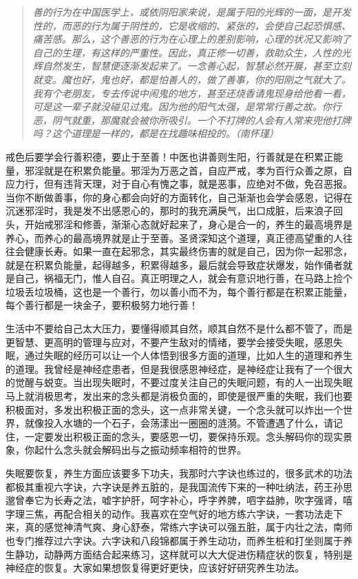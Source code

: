 \begin{quote}\it
    善的行为在中国医学上，或依阴阳家来说，是属于阳的光辉的一面，是开发性的，而恶的行为属于阴性的，它是收缩的、紧张的，会使自己起恐惧感、痛苦感。那么，这个善恶的行为在心理上的差别影响，心理的状况又影响了自己的生理，有这样的严重性。因此，真正修一切善，救助众生，人性的光辉自然发生，智慧便逐渐发起来了。一念善心起，智慧必然开展，甚至立刻就变。魔也好，鬼也好，都是怕善人的，做了善事，你的阳刚之气就大了。我有个老朋友，专去传说中闹鬼的地方，甚至还烧香请鬼现身给他看一看，可是这一辈子就没碰见过鬼。因为他的阳气太强，是常常行善之故。你行恶，阴气就重，那魔就会被你所吸引。一个不打牌的人会有人常来兜他打牌吗？这个道理是一样的，都是在找趣味相投的。（南怀瑾）
\end{quote}

戒色后要学会行善积德，要止于至善！中医也讲善则生阳，行善就是在积累正能量，邪淫就是在积累负能量。邪淫为万恶之首，自应严戒，孝为百行众善之原，自应力行，但有违背天理，对于自心有愧之事，就是恶事，应绝对不做，免召恶报。当你不断做善事，你的身心都会向好的方面转化，自己渐渐也会学会感恩，记得在沉迷邪淫时，我是发不出感恩心的，那时的我充满戾气，出口成脏，后来浪子回头，开始戒邪淫和修善，渐渐心态就好起来了，身心是合一的，养生的最高境界是养心，而养心的最高境界就是止于至善。圣贤深知这个道理，真正德高望重的人往往会健康长寿。如果一直在起邪念，其实最终伤害的就是自己，因为你一起邪念，就是在积累负能量，起得越多，积累得越多，最后就会导致症状爆发，始作俑者就是自己，祸福无门，惟人自召。真正明理之人，就会有意识地行善，在马路上捡个垃圾丢垃圾桶，这也是一个善行，勿以善小而不为，每个善行都是在积累正能量，每个善行都是一块金子，要积极努力地行善！

生活中不要给自己太大压力，要懂得顺其自然，顺其自然不是什么都不管了，而是更智慧、更高明的管理与应对，不要产生敌对的情绪，要学会接受失眠，感恩失眠，通过失眠的经历可以让一个人体悟到很多方面的道理，比如人生的道理和养生的道理。我曾经是神经症患者，但是我很感恩神经症，是神经症让我有了一个很大的觉醒与蜕变。当出现失眠时，不要过度关注自己的失眠问题，有的人一出现失眠马上就消极思考，发出来的念头都是消极负面的，即使是很严重的失眠，我们也要积极面对，多发出积极正面的念头，这一点非常关键，一个念头就可以炸出一个世界，就像投入水塘的一个石子，会荡漾出一圈圈的涟漪。不管遭遇了什么，请记住，一定要发出积极正面的念头，要感恩一切，要保持乐观。念头解码你的现实景象，你起什么念头就会解码出与之振动频率相符的世界。

失眠要恢复，养生方面应该要多下功夫，我那时六字诀也练过的，很多武术的功法都极其重视六字诀，六字诀是养五脏的，是我国流传下来的一种吐纳法，药王孙思邈曾奉它为长寿之法，嘘字护肝，呵字补心，呼字养脾，呬字益肺，吹字强肾，嘻字理三焦，再配合相关的动作。我喜欢在空气好的地方练六字诀，一套功法走下来，真的感觉神清气爽、身心舒泰，常练六字诀可以强五脏，属于内壮之法，南师也专门推荐过六字诀。六字诀和八段锦都属于养生动功，而养生桩和打坐则属于养生静功，动静两方面结合起来练习，这样就可以大大促进伤精症状的恢复，特别是神经症的恢复。大家如果想恢复得更好更快，应该好好研究养生功法。

